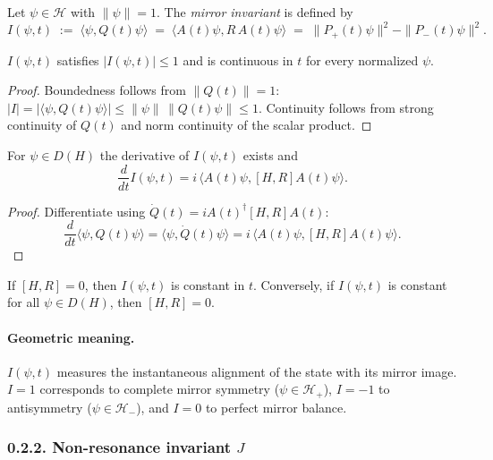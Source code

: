 \begin{definition}
Let $\psi\in\mathcal{H}$ with $\|\psi\|=1$.
The \emph{mirror invariant} is defined by
\[
I(\psi,t) \;:=\; \langle \psi, Q(t)\psi\rangle
\;=\;
\langle A(t)\psi, R\,A(t)\psi\rangle
\;=\;
\|P_+(t)\psi\|^2 - \|P_-(t)\psi\|^2.
\]
\end{definition}

\begin{lemma}
$I(\psi,t)$ satisfies $|I(\psi,t)|\le1$ and is continuous in $t$ for every normalized $\psi$.
\end{lemma}

\begin{proof}
Boundedness follows from $\|Q(t)\|=1$:
$|I|=|\langle\psi,Q(t)\psi\rangle|\le\|\psi\|\,\|Q(t)\psi\|\le1$.
Continuity follows from strong continuity of $Q(t)$ and norm continuity of the scalar product.
\end{proof}

\begin{proposition}
For $\psi\in D(H)$ the derivative of $I(\psi,t)$ exists and
\[
\frac{d}{dt}I(\psi,t)
= i\,\langle A(t)\psi,[H,R]A(t)\psi\rangle.
\]
\end{proposition}

\begin{proof}
Differentiate using $\dot Q(t)=iA(t)^\dagger[H,R]A(t)$:
\[
\frac{d}{dt}\langle\psi,Q(t)\psi\rangle
=\langle\psi,\dot Q(t)\psi\rangle
=i\,\langle A(t)\psi,[H,R]A(t)\psi\rangle.
\]
\end{proof}

\begin{corollary}
If $[H,R]=0$, then $I(\psi,t)$ is constant in $t$. Conversely, if $I(\psi,t)$ is constant for all $\psi\in D(H)$, then $[H,R]=0$.
\end{corollary}

\paragraph{Geometric meaning.}
$I(\psi,t)$ measures the instantaneous alignment of the state with its mirror image.
$I=1$ corresponds to complete mirror symmetry ($\psi\in\mathcal{H}_+$),
$I=-1$ to antisymmetry ($\psi\in\mathcal{H}_-$), and $I=0$ to perfect mirror balance.

\subsubsection*{0.2.2. Non-resonance invariant $J$}

